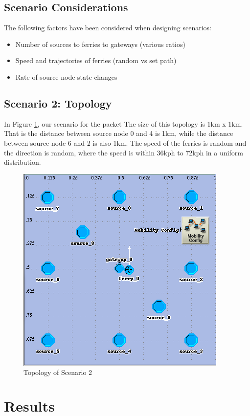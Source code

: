 \subsection{Scenario Considerations}

The following factors have been considered when designing scenarios:
\begin{itemize}
\item Number of sources to ferries to gateways (various ratios)
\item Speed and trajectories of ferries (random vs set path)
\item Rate of source node state changes
\end{itemize}

\subsection{Scenario 2: Topology}

In Figure \ref{fig:scenario2}, our scenario for the packet The size of this topology is 1km x 1km.  
That is the distance between source node 0 and 4 is 1km, while the distance between source node 6 and 2 is also 1km.  
The speed of the ferries is random and the direction is random, where the speed is within 36kph to 72kph in a uniform distribution.  

\begin{figure}[h]
    \centering
    \includegraphics[width=.5\textwidth]{images/scenario2-top}
    \caption{Topology of Scenario 2}
    \label{fig:scenario2}
\end{figure}


\section{Results}

